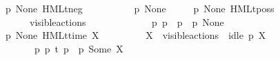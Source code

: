 \begin{isabellebody}
\ \ {\isacharbar}{\kern0pt}\ {\isacartoucheopen}{\isacharparenleft}{\kern0pt}p\ {\isasymTTurnstile}{\isacharquery}{\kern0pt}{\isacharbrackleft}{\kern0pt}None{\isacharbrackright}{\kern0pt}\ {\isacharparenleft}{\kern0pt}HMLt{\isacharunderscore}{\kern0pt}neg\ {\isasymphi}{\isacharparenright}{\kern0pt}{\isacharparenright}{\kern0pt}\ {\isacharequal}{\kern0pt}\ \isanewline
\ \ \ \ \ \ {\isacharparenleft}{\kern0pt}{\isasymnot}\ p\ {\isasymTTurnstile}{\isacharquery}{\kern0pt}{\isacharbrackleft}{\kern0pt}None{\isacharbrackright}{\kern0pt}\ {\isasymphi}{\isacharparenright}{\kern0pt}{\isacartoucheclose}\ \isanewline
\ \ {\isacharbar}{\kern0pt}\ {\isacartoucheopen}{\isacharparenleft}{\kern0pt}p\ {\isasymTTurnstile}{\isacharquery}{\kern0pt}{\isacharbrackleft}{\kern0pt}None{\isacharbrackright}{\kern0pt}\ {\isacharparenleft}{\kern0pt}HMLt{\isacharunderscore}{\kern0pt}poss\ {\isasymalpha}\ {\isasymphi}{\isacharparenright}{\kern0pt}{\isacharparenright}{\kern0pt}\ {\isacharequal}{\kern0pt}\ \isanewline
\ \ \ \ \ \ {\isacharparenleft}{\kern0pt}{\isacharparenleft}{\kern0pt}{\isasymalpha}\ {\isasymin}\ visible{\isacharunderscore}{\kern0pt}actions\ {\isasymunion}\ {\isacharbraceleft}{\kern0pt}{\isasymtau}{\isacharbraceright}{\kern0pt}{\isacharparenright}{\kern0pt}\ {\isasymand}\ \isanewline
\ \ \ \ \ \ \ \ {\isacharparenleft}{\kern0pt}{\isasymexists}\ p{\isacharprime}{\kern0pt}{\isachardot}{\kern0pt}\ p\ {\isasymlongmapsto}{\isasymalpha}\ p{\isacharprime}{\kern0pt}\ {\isasymand}\ p{\isacharprime}{\kern0pt}\ {\isasymTTurnstile}{\isacharquery}{\kern0pt}{\isacharbrackleft}{\kern0pt}None{\isacharbrackright}{\kern0pt}\ {\isasymphi}{\isacharparenright}{\kern0pt}{\isacharparenright}{\kern0pt}{\isacartoucheclose}\ \isanewline
\ \ {\isacharbar}{\kern0pt}\ {\isacartoucheopen}{\isacharparenleft}{\kern0pt}p\ {\isasymTTurnstile}{\isacharquery}{\kern0pt}{\isacharbrackleft}{\kern0pt}None{\isacharbrackright}{\kern0pt}\ {\isacharparenleft}{\kern0pt}HMLt{\isacharunderscore}{\kern0pt}time\ X\ {\isasymphi}{\isacharparenright}{\kern0pt}{\isacharparenright}{\kern0pt}\ {\isacharequal}{\kern0pt}\ \isanewline
\ \ \ \ \ \ {\isacharparenleft}{\kern0pt}{\isacharparenleft}{\kern0pt}X\ {\isasymsubseteq}\ visible{\isacharunderscore}{\kern0pt}actions{\isacharparenright}{\kern0pt}\ {\isasymand}\ {\isacharparenleft}{\kern0pt}idle\ p\ X{\isacharparenright}{\kern0pt}\ {\isasymand}\ \isanewline
\ \ \ \ \ \ \ \ {\isacharparenleft}{\kern0pt}{\isasymexists}\ p{\isacharprime}{\kern0pt}{\isachardot}{\kern0pt}\ p\ {\isasymlongmapsto}t\ p{\isacharprime}{\kern0pt}\ {\isasymand}\ p{\isacharprime}{\kern0pt}\ {\isasymTTurnstile}{\isacharquery}{\kern0pt}{\isacharbrackleft}{\kern0pt}Some\ X{\isacharbrackright}{\kern0pt}\ {\isasymphi}{\isacharparenright}{\kern0pt}{\isacharparenright}{\kern0pt}{\isacartoucheclose}\ \isanewline

\end{isabellebody}
